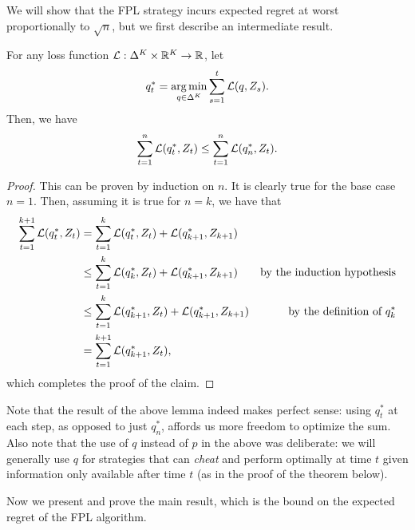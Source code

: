 We will show that the FPL strategy incurs expected regret at worst proportionally to $\sqrt{n}$, but we first describe an intermediate result.
\begin{lemma}\label{lem:be_the_leader}
For any loss function $\mathcal{L} : \Delta^K \times \mathbb{R}^K \rightarrow \mathbb{R}$, let 
\[
q_t^* = \operatorname*{arg\,min}_{q \in \Delta^K} \sum_{s=1}^t \mathcal{L}(q, Z_s).
\]
Then, we have
\[
\sum_{t=1}^n \mathcal{L}(q_t^*, Z_t) \leq \sum_{t=1}^n \mathcal{L}(q^*_n, Z_t).
\]
\begin{proof}
This can be proven by induction on $n$. It is clearly true for the base case $n = 1$. Then, assuming it is true for $n = k$, we have that 
\begin{align*}
\sum_{t=1}^{k+1} \mathcal{L}(q_t^*, Z_t) &= \sum_{t=1}^k \mathcal{L}(q_t^*, Z_t) + \mathcal{L}(q_{k+1}^*, Z_{k+1}) &\\
&\leq \sum_{t=1}^k \mathcal{L}(q_k^*, Z_t) + \mathcal{L}(q_{k+1}^*, Z_{k+1}) &\text{by the induction hypothesis} \\
&\leq \sum_{t=1}^k \mathcal{L}(q_{k+1}^*, Z_t) + \mathcal{L}(q_{k+1}^*, Z_{k+1}) &\text{by the definition of $q_k^*$} \\
&= \sum_{t=1}^{k+1} \mathcal{L}(q_{k+1}^*, Z_t),
\end{align*}
which completes the proof of the claim.
\end{proof}
\end{lemma}

Note that the result of the above lemma indeed makes perfect sense: using $q_t^*$ at each step, as opposed to just $q_n^*$, affords us more freedom to optimize the sum. Also note that the use of $q$ instead of $p$ in the above was deliberate: we will generally use $q$ for strategies that can \emph{cheat} and perform optimally at time $t$ given information only available after time $t$ (as in the proof of the theorem below).

Now we present and prove the main result, which is the bound on the expected regret of the FPL algorithm.

